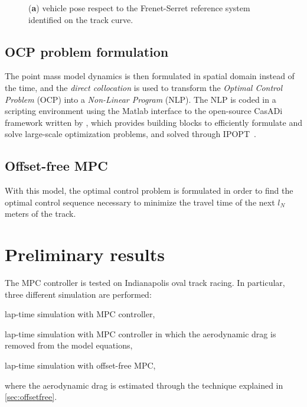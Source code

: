 \documentclass[conference]{IEEEtran} %
\begin{document}
\begin{figure}[htb] \centering
	\caption{(\textbf{a}) vehicle pose respect to the Frenet-Serret reference system identified on the track curve.}
	\label{fig:scheme_frenet_serret}
\end{figure}


\subsection{OCP problem formulation}

The point mass model dynamics is then formulated in spatial domain instead of the time, and the \emph{direct collocation} is used to transform the \emph{Optimal Control Problem} (OCP) into a \emph{Non-Linear Program} (NLP). The NLP is coded in a scripting environment using the Matlab interface to the open-source CasADi framework written by \citet{Andersson2019}, which provides building
blocks to efficiently formulate and solve large-scale optimization problems, and solved through IPOPT~\cite{Wachter2006}.

\subsection{Offset-free MPC}

With this model, the optimal control problem is formulated in order to find the optimal control sequence necessary to minimize the travel time of the next $l_N$ meters of the track.



\section{Preliminary results}
The MPC controller is tested on Indianapolis oval track racing. In particular, three different simulation are performed:
\begin{enumerate*}[label=(\roman*)]
	\item lap-time simulation with MPC controller,
	\item lap-time simulation with MPC controller in which the aerodynamic drag is removed from the model equations,
	\item lap-time simulation with offset-free MPC,
\end{enumerate*}
where the aerodynamic drag is estimated through the technique explained in \ref{sec:offsetfree}.
\end{document}
